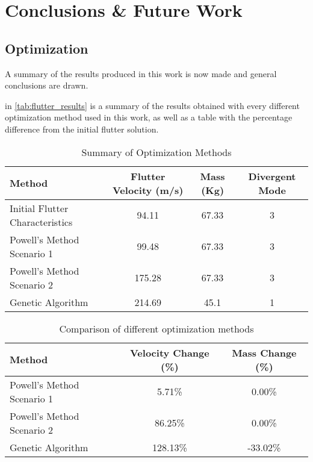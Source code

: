 \chapter{Conclusions \& Future Work}
\label{conclusions-future-work}

\section{Optimization }\label{optimization}

A summary of the results produced in this work is now made and general
conclusions are drawn.

in \autoref{tab:flutter_results} is a summary of the results obtained with every different
optimization method used in this work, as well as a table with the
percentage difference from the initial flutter solution.

\begin{table}[h]
  \footnotesize
  \centering
  \setlength{\tabcolsep}{5pt}
  \renewcommand{\arraystretch}{1.2}
  \begin{tabularx}{\textwidth}{lccc}
      \toprule
      \textbf{Method} & \textbf{Flutter Velocity (m/s)} & \textbf{Mass (Kg)} & \textbf{Divergent Mode} \\
      \midrule
      Initial Flutter Characteristics & 94.11 & 67.33 & 3 \\
      Powell’s Method Scenario 1 & 99.48 & 67.33 & 3 \\
      Powell’s Method Scenario 2 & 175.28 & 67.33 & 3 \\
      Genetic Algorithm & 214.69 & 45.1 & 1 \\
      \bottomrule
  \end{tabularx}
  \caption{Summary of Optimization Methods}
  \label{tab:flutter_results}
\end{table}

\begin{table}[h]
  \centering
  \footnotesize
  \setlength{\tabcolsep}{5pt}
  \renewcommand{\arraystretch}{1.2}
  \begin{tabular}{lcc}
      \toprule
      \textbf{Method} & \textbf{Velocity Change (\%)} & \textbf{Mass Change (\%)} \\
      \midrule
      Powell’s Method Scenario 1 & 5.71\% & 0.00\% \\
      Powell’s Method Scenario 2 & 86.25\% & 0.00\% \\
      Genetic Algorithm & 128.13\% & -33.02\% \\
      \bottomrule
  \end{tabular}
  \caption{Comparison of different optimization methods}
  \label{tab:flutter_changes}
\end{table}

